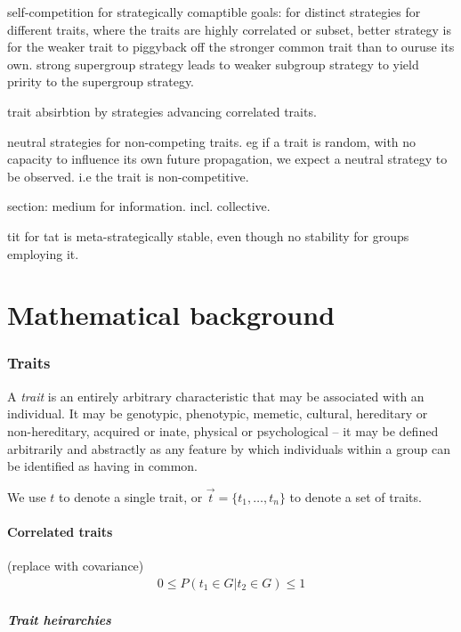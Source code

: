 \documentclass[twocolumn, aps, rmp, amsmath, amssymb, nofootinbib, superscriptaddress, longbibliography, floatfix, table-of-contents, eqsecnum]{revtex4-2}
\begin{document}
self-competition for strategically comaptible goals:
for distinct strategies for different traits, where the traits are highly correlated or subset, better strategy is for the weaker trait to piggyback off the stronger common trait than to ouruse its own. strong supergroup strategy leads to weaker subgroup strategy to yield pririty to the supergroup strategy.

trait absirbtion by strategies advancing correlated traits. 

neutral strategies for non-competing traits. eg if a trait is random, with no capacity to influence its own future propagation, we expect a neutral strategy to be observed. i.e the trait is non-competitive.

section: medium for information. incl. collective.

tit for tat is meta-strategically stable, even though no stability for groups employing it.

%
%

\part{Mathematical background}

\section{Traits}

A \textit{trait} is an entirely arbitrary characteristic that may be associated with an individual. It may be genotypic, phenotypic, memetic, cultural, hereditary or non-hereditary, acquired or inate, physical or psychological -- it may be defined arbitrarily and abstractly as any feature by which individuals within a group can be identified as having in common.

We use $t$ to denote a single trait, or $\vec t=\{t_1,\dots,t_n\}$ to denote a set of traits.

\subsection{Correlated traits}

(replace with covariance)
\begin{align}
0\leq P(t_1\in G | t_2\in G)\leq 1	
\end{align}

\subsubsection{Trait heirarchies}
\end{document}
